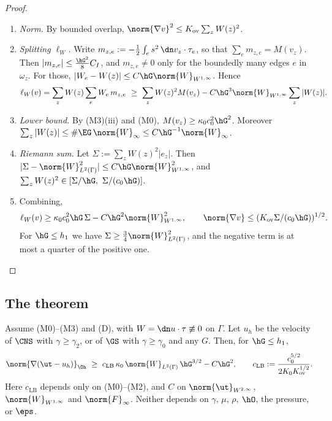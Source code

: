 \begin{proof}
\begin{enumerate}
\item \emph{Norm.} By bounded overlap, $\norm{\nabla v}^2\le K_{\mathrm{ov}}\sum_zW(z)^2$.
\item \emph{Splitting $\ell_W$.} Write $m_{z,e}:=-\frac12\int_es^2\,\dn v_z\cdot\tau_e$, so that $\sum_em_{z,e}=M(v_z)$. Then $|m_{z,e}|\le\frac{\hG^2}{8}C_I$, and $m_{z,e}\ne0$ only for the boundedly many edges $e$ in $\omega_z$. For those, $|W_e-W(z)|\le C\hG\norm{W}_{W^{1,\infty}}$. Hence
\[
\ell_W(v)=\sum_zW(z)\sum_eW_e\,m_{z,e}\ \ge\ \sum_zW(z)^2M(v_z)-C\hG^3\norm{W}_{W^{1,\infty}}\sum_z|W(z)| .
\]
\item \emph{Lower bound.} By (M3)(iii) and (M0), $M(v_z)\ge\kappa_0c_0^2\hG^2$. Moreover $\sum_z|W(z)|\le\#\EG\,\norm{W}_\infty\le C\hG^{-1}\norm{W}_\infty$.
\item \emph{Riemann sum.} Let $\Sigma:=\sum_zW(z)^2|e_z|$. Then $|\Sigma-\norm{W}^2_{L^2(\Gamma)}|\le C\hG\norm{W}^2_{W^{1,\infty}}$, and $\sum_zW(z)^2\in[\Sigma/\hG,\ \Sigma/(c_0\hG)]$.
\item Combining,
\[
\ell_W(v)\ge\kappa_0c_0^2\hG\,\Sigma-C\hG^2\norm{W}^2_{W^{1,\infty}},\qquad \norm{\nabla v}\le(K_{\mathrm{ov}}\Sigma/(c_0\hG))^{1/2}.
\]
For $\hG\le h_1$ we have $\Sigma\ge\frac34\norm{W}^2_{L^2(\Gamma)}$, and the negative term is at most a quarter of the positive one.\qedhere
\end{enumerate}
\end{proof}

\subsection{The theorem}

\begin{theorem}\label{lb:thm}
Assume (M0)--(M3) and (D), with $W=\dn u\cdot\tau\not\equiv0$ on $\Gamma$. Let $u_h$ be the velocity of $\CNS$ with $\gamma\ge\gamma_2$, or of $\GS$ with $\gamma\ge\gamma_0$ and any $G$. Then, for $\hG\le h_1$,
\[
\norm{\nabla(\ut-u_h)}_{\Oh}\ \ge\ c_{\mathrm{LB}}\,\kappa_0\,\norm{W}_{L^2(\Gamma)}\,\hG^{3/2}-C\hG^{2},\qquad c_{\mathrm{LB}}:=\frac{c_0^{5/2}}{2K_0K_{\mathrm{ov}}^{1/2}} .
\]
Here $c_{\mathrm{LB}}$ depends only on (M0)--(M2), and $C$ on $\norm{\ut}_{W^{2,\infty}}$, $\norm{W}_{W^{1,\infty}}$ and $\norm{F}_\infty$. Neither depends on $\gamma$, $\mu$, $\rho$, $\hO$, the pressure, or $\eps$.
\end{theorem}


